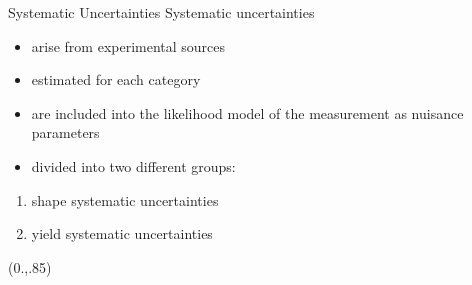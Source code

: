 \documentclass[10pt,UKenglish, leqno, xcolor = dvipsnames]{beamer}
\begin{document}
	\begin{frame}{Systematic Uncertainties}
		\vfill
		Systematic uncertainties
		\begin{itemize}
			\item arise from experimental sources
			\item estimated for each category
			\item  are included into the likelihood model of the measurement as nuisance parameters
			\item divided into two different groups:
		\end{itemize}
		\vspace{.5cm}
		\begin{enumerate}\centering
			\item shape systematic uncertainties
			\item yield systematic uncertainties
		\end{enumerate}
		\vfill
		\begin{textblock}{1}(0.,.85)
			\begin{figure}
			\end{figure}
		\end{textblock}
	\end{frame}
\end{document}
